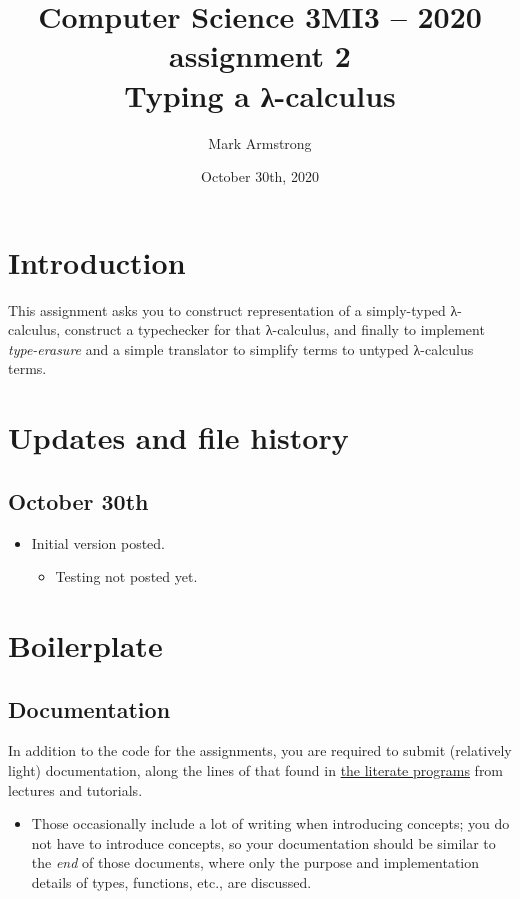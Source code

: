 \documentclass[11pt]{article}
\author{Mark Armstrong}
\date{October 30th, 2020}
\title{Computer Science 3MI3 – 2020 assignment 2\\\medskip
\large Typing a λ-calculus}
\begin{document}
\maketitle
\tableofcontents


\section*{Introduction}
\label{sec:org2fac194}
This assignment asks you to construct representation
of a simply-typed λ-calculus, construct a typechecker for that
λ-calculus, and finally to implement \emph{type-erasure} and a
simple translator to simplify terms to untyped λ-calculus terms.

\section*{Updates and file history}
\label{sec:orgd986b52}
\subsection*{October 30th}
\label{sec:orgfce143a}

\begin{itemize}
\item Initial version posted.
\begin{itemize}
\item Testing not posted yet.
\end{itemize}
\end{itemize}

\section*{Boilerplate}
\label{sec:org4f56fb0}
\subsection*{Documentation}
\label{sec:org3be3349}
In addition to the code for the assignments,
you are required to submit (relatively light) documentation,
along the lines of that found in
\href{https://armkeh.github.io/principles-of-programming-languages/\#outline-container-Lecture-literate-programs}{the literate programs}
from lectures and tutorials.
\begin{itemize}
\item Those occasionally include a lot of writing when introducing concepts;
you do not have to introduce concepts, so your documentation
should be similar to the \emph{end} of those documents,
where only the purpose and implementation details
of types, functions, etc., are discussed.
\end{itemize}
\end{document}
